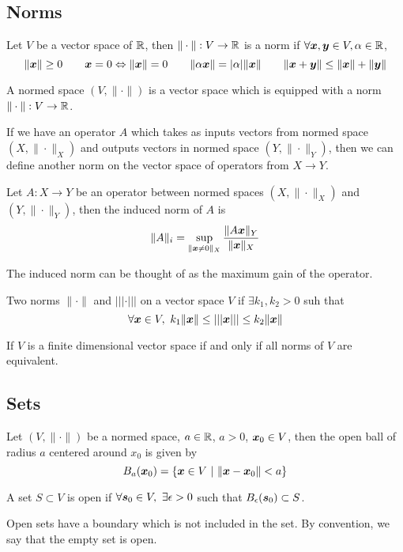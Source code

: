 \subsection{Norms}
\begin{definition}
	Let $V$ be a vector space of $\mathbb{R}$, then $\|\cdot\|: V \to \mathbb{R}$ is a norm if
	$\forall \boldsymbol{x},\boldsymbol{y}\in V, \alpha \in \mathbb{R}$, \[
		\|\boldsymbol{x}\| \geq 0 \qquad \boldsymbol{x} = 0 \Leftrightarrow \|\boldsymbol{x}\| = 0 \qquad
		\|\alpha \boldsymbol{x}\| = |\alpha|\|\boldsymbol{x}\| \qquad \|\boldsymbol{x} + \boldsymbol{y}\| \leq
		\|\boldsymbol{x}\| + \|\boldsymbol{y}\|
	\]
	\label{defn:norm}
\end{definition}
\begin{definition}
	A normed space $(V, \|\cdot\|)$ is a vector space which is equipped with a
	norm $\|\cdot\|: V \to \mathbb{R}$.
	\label{defn:normed-space}
\end{definition}
If we have an operator $A$ which takes as inputs vectors from normed space $(X,
\|\cdot\|_X)$ and outputs vectors in normed space $(Y, \|\cdot\|_Y)$, then we
can define another norm on the vector space of operators from $X\to Y$.
\begin{definition}
	Let $A:X\to Y$ be an operator between normed spaces $(X, \|\cdot\|_X)$ and
	$(Y, \|\cdot\|_Y)$, then the induced norm of $A$ is \[
		\|A\|_i = \sup_{\|\boldsymbol{x} \neq 0\|_X} \frac{\|A\boldsymbol{x}\|_Y}{\|\boldsymbol{x}\|_X}
	\]
	\label{defn:induced-norm}
\end{definition}
The induced norm can be thought of as the maximum gain of the operator.
\begin{definition}
	Two norms $\|\cdot\|$ and $|||\cdot|||$ on a vector space $V$ if $\exists k_1,
	k_2 > 0$ suh that \[
		\forall \boldsymbol{x}\in V,\ k_1\|\boldsymbol{x}\| \leq |||\boldsymbol{x}||| \leq k_2\|\boldsymbol{x}\|
	\]
	\label{defn:equivalent-norm}
\end{definition}
If $V$ is a finite dimensional vector space if and only if all norms of $V$ are
equivalent.

\subsection{Sets}
\begin{definition}
	Let $(V, \|\cdot\|)$ be a normed space, $a\in \mathbb{R}$, $a > 0$, $\boldsymbol{x}_0\in V$,
	then the open ball of radius $a$ centered around $x_0$ is given by \[
		B_a(\boldsymbol{x}_0) = \{ \boldsymbol{x} \in V \ | \ \|\boldsymbol{x} - \boldsymbol{x}_0\| < a \}
	\]
	\label{defn:open-ball}
\end{definition}
\begin{definition}
	A set $S\subset V$ is open if $\forall \boldsymbol{s}_0\in V,\ \exists \epsilon > 0$
	such that $B_\epsilon(\boldsymbol{s}_0) \subset S$.
	\label{defn:open-set}
\end{definition}
Open sets have a boundary which is not included in the set. By convention, we
say that the empty set is open.

